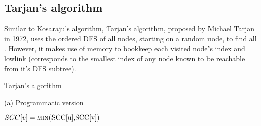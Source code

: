 \subsection{Tarjan's algorithm} \label{algorithm-scc-tarjan}
Similar to Kosaraju's algorithm, Tarjan's algorithm, proposed by Michael Tarjan in 1972, \cite{tarjan72} uses the ordered DFS of all nodes, starting on a random node, to find all . However, it makes use of memory to bookkeep each visited node's index and lowlink (corresponds to the smallest index of any node known to be reachable from it's DFS subtree). 
\begin{center}
    \begin{algorithm}[H]
        \caption{Tarjan's algorithm}
        \label{alg-tarjan}
        \begin{minipage}[t]{0.80\linewidth}
            (a) Programmatic version
            \begin{algorithmic}[1]


                         {}
                        \EndIf
                         {$SCC[v] = \Call{min}{$SCC[u]$, $SCC[v]$}$}
                        \EndIf
                    \EndFor

                        \EndWhile
                    \EndIf
                \EndFunction

                    \EndFor
                        \EndIf
                    \EndFor
                    \State {}
                \EndFunction
            \end{algorithmic}
        \end{minipage}
    \end{algorithm}
\end{center}
